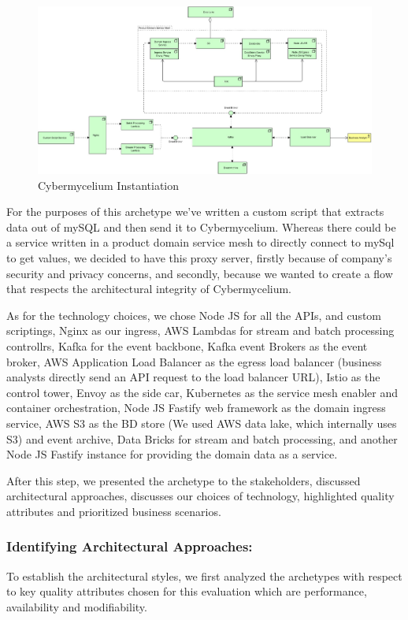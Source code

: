 \documentclass[review]{elsarticle}
\begin{document}
\begin{figure}
    \includegraphics[width=23cm]{Media/concrete-mycelium.jpg}
    \caption{Cybermycelium Instantiation}
    \label{fig:ConcreteCyberMycelium}
\end{figure}

For the purposes of this archetype we've written a custom script that extracts data out of mySQL and then send it to Cybermycelium. Whereas there could be a service written in a product domain service mesh to directly connect to mySql to get values, we decided to have this proxy server, firstly because of company's security and privacy concerns, and secondly, because we wanted to create a flow that respects the architectural integrity of Cybermycelium.

As for the technology choices, we chose Node JS for all the APIs, and custom scriptings, Nginx as our ingress, AWS Lambdas for stream and batch processing controllrs, Kafka for the event backbone, Kafka event Brokers as the event broker, AWS Application Load Balancer as the egress load balancer (business analysts directly send an API request to the load balancer URL), Istio as the control tower, Envoy as the side car, Kubernetes as the service mesh enabler and container orchestration, Node JS Fastify web framework as the domain ingress service, AWS S3 as the BD store (We used AWS data lake, which internally uses S3) and event archive, Data Bricks for stream and batch processing, and another Node JS Fastify instance for providing the domain data as a service.

After this step, we presented the archetype to the stakeholders, discussed architectural approaches, discusses our choices of technology, highlighted quality attributes and prioritized business scenarios.

\subsubsection{Identifying Architectural Approaches:} To establish the architectural styles, we first analyzed the archetypes with respect to key quality attributes chosen for this evaluation which are performance, availability and modifiability.
\end{document}
